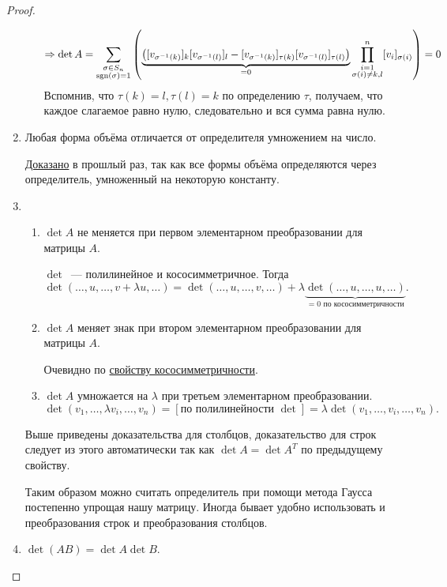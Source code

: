 \begin{proof}
\begin{enumerate}
\begin{itemize}
\[\begin{gathered}
                        \Rightarrow \det A = 
                        \sum\limits_{\substack{\sigma\in S_n\\\operatorname{sgn}(\sigma)=1}}
                        \left(\underbrace{\left([v_{\sigma^{-1}(k)}]_k [v_{\sigma^{-1}(l)}]_l -
                            [v_{\sigma^{-1}(k)}]_{\tau(k)} [v_{\sigma^{-1}(l)}]_{\tau(l)}\right)}_{=0}
                        \prod\limits_{\substack{i=1\\\sigma(i)\not=k,l}}^{n}[v_i]_{\sigma(i)}\right) = 0
                    \end{gathered}
                    \] 
                    Вспомнив, что $\tau(k) = l, \tau(l) = k$ по определению $\tau$, получаем, что каждое 
                    слагаемое равно нулю, следовательно и вся сумма равна нулю.
            \end{itemize}
        \item Любая форма объёма отличается от определителя умножением на число.

            \hyperref[stm:О пространстве форм объёма]{Доказано} в прошлый раз,
            так как все формы объёма определяются через определитель, умноженный
            на некоторую константу.
        \item 
            \begin{enumerate}
                \item $\det A$ не меняется при первом элементарном преобразовании для матрицы $A$.

                    $\det$~--- полилинейное и кососимметричное. Тогда
                    \[
                        \det(\dots, u, \dots, v + \lambda u, \dots) = \det(\dots, u, \dots, v,\dots) +
                        \lambda \underbrace{\det(\dots, u,\dots, u,\dots)}_{=0\text{ по кососимметричности}}
                    .\]
                \item $\det A$ меняет знак при втором элементарном преобразовании для матрицы $A$.
                    
                    Очевидно по \hyperref[stm:Свойство кососимметричного отображения]{свойству кососимметричности}.
                \item
                    $\det A$ умножается на $\lambda$ при третьем элементарном преобразовании.
                    \[
                        \det (v_1,\dots, \lambda v_i, \dots, v_n) =[\text{по полилинейности } \det]= \lambda \det (v_1, \dots, v_i, \dots, v_n)
                    .\]
            \end{enumerate}
            Выше приведены доказательства для столбцов, доказательство для строк следует из этого
            автоматически так как $\det A = \det A^T$ по предыдущему свойству.
            \begin{remark}
                Таким образом можно считать определитель при помощи метода Гаусса постепенно 
                упрощая нашу матрицу. 
                Иногда бывает удобно использовать и преобразования строк и преобразования столбцов.
            \end{remark}
        \item
            $\det(AB) = \det A \det B$.


\end{enumerate}
\end{proof}
